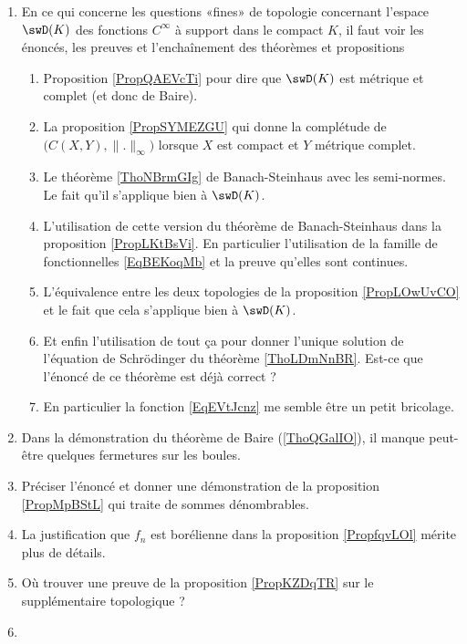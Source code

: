 \begin{enumerate}
        \item
            En ce qui concerne les questions «fines» de topologie concernant l'espace \( \swD(K)\) des fonctions \(  C^{\infty}\) à support dans le compact \( K\), il faut voir les énoncés, les preuves et l'enchaînement des théorèmes et propositions
            \begin{enumerate}
                \item Proposition \ref{PropQAEVcTi} pour dire que \( \swD(K)\) est métrique et complet (et donc de Baire).
                \item La proposition \ref{PropSYMEZGU} qui donne la complétude de \( \big( C(X,Y),\| . \|_{\infty} \big)\) lorsque \( X\) est compact et \( Y\) métrique complet.
                \item Le théorème \ref{ThoNBrmGIg} de Banach-Steinhaus avec les semi-normes. Le fait qu'il s'applique bien à \( \swD(K)\).
                \item L'utilisation de cette version du théorème de Banach-Steinhaus dans la proposition \ref{PropLKtBsVi}. En particulier l'utilisation de la famille de fonctionnelles \eqref{EqBEKoqMb} et la preuve qu'elles sont continues.
                \item
                    L'équivalence entre les deux topologies de la proposition \ref{PropLOwUvCO} et le fait que cela s'applique bien à \( \swD(K)\).
                \item
                    Et enfin l'utilisation de tout ça pour donner l'unique solution de l'équation de Schrödinger du théorème \ref{ThoLDmNnBR}. Est-ce que l'énoncé de ce théorème est déjà correct ?
                \item
                    En particulier la fonction \eqref{EqEVtJcnz} me semble être un petit bricolage. 
            \end{enumerate}
    \item
        Dans la démonstration du théorème de Baire (\ref{ThoQGalIO}), il manque peut-être quelques fermetures sur les boules.
    \item
        Préciser l'énoncé et donner une démonstration de la proposition \ref{PropMpBStL} qui traite de sommes dénombrables.
    \item
        La justification que \( f_n\) est borélienne dans la proposition \ref{PropfqvLOl} mérite plus de détails.
    \item
        Où trouver une preuve de la proposition \ref{PropKZDqTR} sur le supplémentaire topologique ?
    \item

\end{enumerate}
